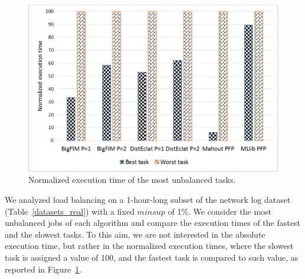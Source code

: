 \documentclass[preprint,review,12pt]{elsarticle}
\begin{document}
\begin{figure}[!t]
\begin{center}
\includegraphics[width=5in]{load_balance_big_2.eps}
\caption{Normalized execution time of the most unbalanced tasks.}
\label{load_balance_big}
\end{center}
\end{figure}



We analyzed load balancing on a 1-hour-long subset of the
network log dataset (Table~\ref{datasets_real}) with a fixed $minsup$ of 1\%.
We consider the most unbalanced jobs of each algorithm
and compare the execution times of the fastest and the slowest tasks.
To this aim, we are not interested in the absolute execution time,
but rather in the normalized execution times, where the slowest task is
assigned a value of 100, and the fastest task is compared to such value,
as reported in Figure~\ref{load_balance_big}.
\end{document}
